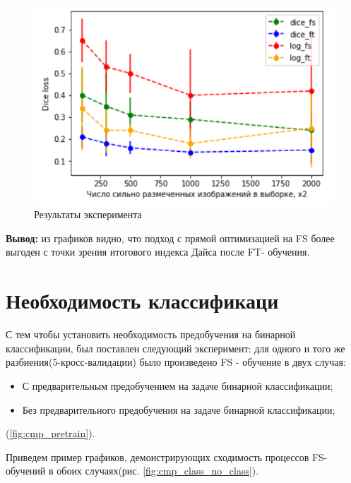 \begin{figure}[h!] 
  \center
  \includegraphics [scale=1.0] {images/plot_results.png}
  \caption{ Результаты эксперимента} 
\end{figure}

{\bf Вывод:} из графиков видно, что подход с прямой оптимизацией на FS более выгоден с точки зрения итогового индекса Дайса после FT- обучения.

\newpage
\section{Необходимость классификаци}

С тем чтобы установить необходимость предобучения на бинарной классификации, был поставлен следующий эксперимент: для одного и того же разбиения(5-кросс-валидации) было произведено FS - обучение в двух случая:
\begin{itemize}
    \item С предварительным предобучением на задаче бинарной классификации;
    \item Без предварительного предобучения на задаче бинарной классификации;
\end{itemize}

(\ref{fig:cmp_pretrain}).

Приведем пример графиков, демонстрирующих сходимость процессов FS-обучений в обоих случаях(рис. \ref{fig:cmp_class_no_class}).


